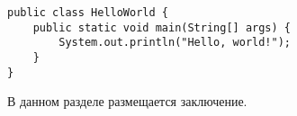 \documentclass[times]{itmo-student-thesis}
\begin{document}
\begin{lstlisting}[float=!h,caption={Пример исходного кода на Java},label={lst1}]
public class HelloWorld {
    public static void main(String[] args) {
        System.out.println("Hello, world!");
    }
}
\end{lstlisting}

\startconclusionpage

В данном разделе размещается заключение.

\printmainbibliography

\appendix
\end{document}
